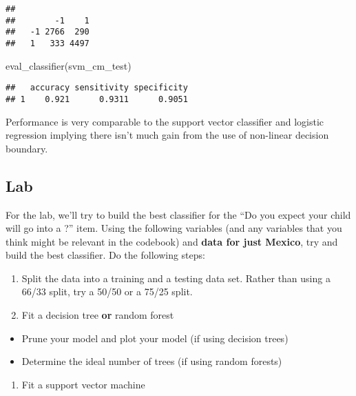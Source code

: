 \documentclass[
]{book}
\newenvironment{Shaded}{\begin{snugshade}}{\end{snugshade}}
\newcommand{\FunctionTok}[1]{\textcolor[rgb]{0.00,0.00,0.00}{#1}}
\newcommand{\NormalTok}[1]{#1}
\providecommand{\tightlist}{%
  \setlength{\itemsep}{0pt}\setlength{\parskip}{0pt}}
\begin{document}
\begin{verbatim}
##     
##        -1    1
##   -1 2766  290
##   1   333 4497
\end{verbatim}

\begin{Shaded}
\begin{Highlighting}[]
\FunctionTok{eval\_classifier}\NormalTok{(svm\_cm\_test)}
\end{Highlighting}
\end{Shaded}

\begin{verbatim}
##   accuracy sensitivity specificity
## 1    0.921      0.9311      0.9051
\end{verbatim}

Performance is very comparable to the support vector classifier and logistic regression implying there isn't much gain from the use of non-linear decision boundary.

\hypertarget{lab-2}{%
\subsection{Lab}\label{lab-2}}

For the lab, we'll try to build the best classifier for the ``Do you expect your child will go into a ?'' item. Using the following variables (and any variables that you think might be relevant in the codebook) and \textbf{data for just Mexico}, try and build the best classifier. Do the following steps:

\begin{enumerate}
\def\labelenumi{\arabic{enumi}.}
\item
  Split the data into a training and a testing data set. Rather than using a 66/33 split, try a 50/50 or a 75/25 split.
\item
  Fit a decision tree \textbf{or} random forest
\end{enumerate}

\begin{itemize}
\tightlist
\item
  Prune your model and plot your model (if using decision trees)
\item
  Determine the ideal number of trees (if using random forests)
\end{itemize}

\begin{enumerate}
\def\labelenumi{\arabic{enumi}.}
\setcounter{enumi}{2}
\tightlist
\item
  Fit a support vector machine
\end{enumerate}
\end{document}
